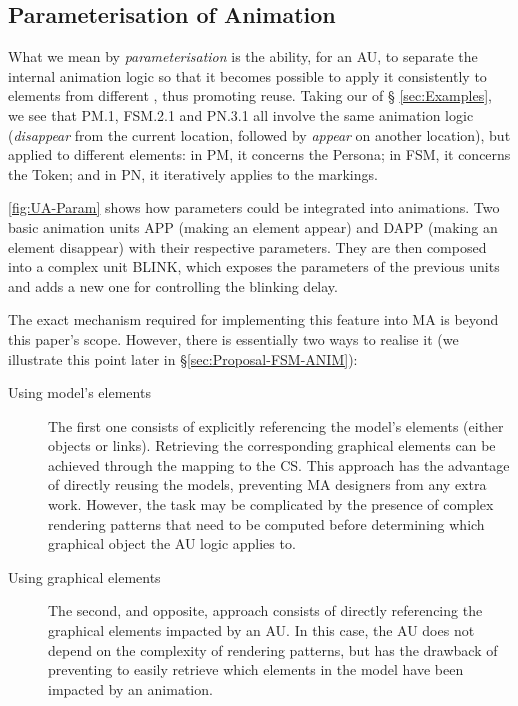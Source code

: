\subsection{Parameterisation of Animation}
\label{sec:Param}

What we mean by \emph{parameterisation} is the ability, for an AU, to separate 
the internal animation logic so that it becomes possible to apply it consistently
to elements from different \DSLs, thus promoting reuse. Taking our \DSLs of \S 
\ref{sec:Examples}, we see that \textsf{PM.1}, \textsf{FSM.2.1} and \textsf{PN.3.1}
all involve the same animation logic (\emph{disappear} from the current location, 
followed by \emph{appear} on another location), but applied to different elements:
in \textsf{PM}, it concerns the \textsf{Persona}; in \textsf{FSM}, it concerns the
\textsf{Token}; and in \textsf{PN}, it iteratively applies to the markings.

\autoref{fig:UA-Param} shows how parameters could be integrated into animations. 
Two basic animation units \textsf{APP} (making an element appear) and \textsf{DAPP}
(making an element disappear) with their respective parameters. They are then
composed into a complex unit \textsf{BLINK}, which exposes the parameters of
the previous units and adds a new one for controlling the blinking delay.

The exact mechanism required for implementing this feature into MA is beyond this
paper's scope. However, there is essentially two ways to realise it (we illustrate
this point later in \S \ref{sec:Proposal-FSM-ANIM}):
\begin{description}
   \item[Using model's elements] The first one consists of explicitly referencing
   the model's elements (either objects or links). Retrieving the corresponding 
   graphical elements can be achieved through the mapping to the CS. This approach
   has the advantage of directly reusing the models, preventing MA designers from
   any extra work. However, the task may be complicated by the presence of complex
   rendering patterns that need to be computed before determining which graphical
   object the AU logic applies to.
   
   \item[Using graphical elements] The second, and opposite, approach consists
   of directly referencing the graphical elements impacted by an AU. In this case,
   the AU does not depend on the complexity of rendering patterns, but has the 
   drawback of preventing to easily retrieve which elements in the model have been
   impacted by an animation.
\end{description}

